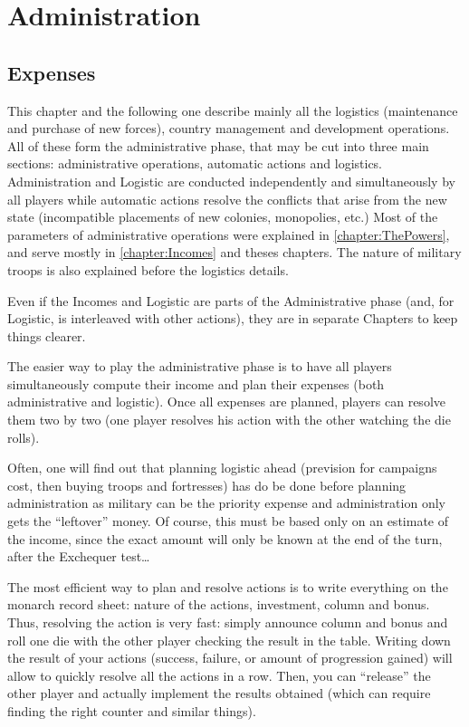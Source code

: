 
\chapter{Administration}\label{chapter:Administration}
\section{Expenses}
This chapter and the following one describe mainly all the logistics
(maintenance and purchase of new forces), country management and development
operations. All of these form the administrative phase, that may be cut into
three main sections: administrative operations, automatic actions and
logistics. Administration and Logistic are conducted independently and
simultaneously by all players while automatic actions resolve the conflicts
that arise from the new state (incompatible placements of new colonies,
monopolies, etc.) Most of the parameters of administrative operations were
explained in \ref{chapter:ThePowers}, and serve mostly
in \ref{chapter:Incomes} and theses chapters. The nature of military troops is
also explained before the logistics details.

Even if the Incomes and Logistic are parts of the Administrative phase (and,
for Logistic, is interleaved with other actions), they are in separate
Chapters to keep things clearer.

\begin{playtip}
  The easier way to play the administrative phase is to have all players
  simultaneously compute their income and plan their expenses (both
  administrative and logistic). Once all expenses are planned, players can
  resolve them two by two (one player resolves his action with the other
  watching the die rolls).

  Often, one will find out that planning logistic ahead (prevision for
  campaigns cost, then buying troops and fortresses) has do be done before
  planning administration as military can be the priority expense and
  administration only gets the ``leftover'' money. Of course, this must be
  based only on an estimate of the income, since the exact amount will only be
  known at the end of the turn, after the Exchequer test\ldots

  The most efficient way to plan and resolve actions is to write everything on
  the monarch record sheet: nature of the actions, investment, column and
  bonus. Thus, resolving the action is very fast: simply announce column and
  bonus and roll one die with the other player checking the result in the
  table. Writing down the result of your actions (success, failure, or amount
  of progression gained) will allow to quickly resolve all the actions in a
  row. Then, you can ``release'' the other player and actually implement the
  results obtained (which can require finding the right counter and similar
  things).
\end{playtip}

